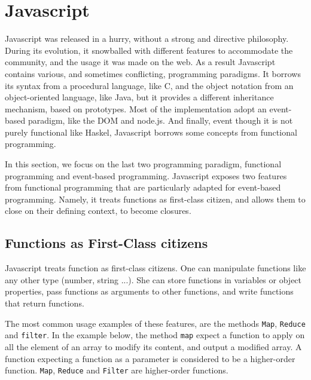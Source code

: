 \section{Javascript}

Javascript was released in a hurry, without a strong and directive philosophy.
During its evolution, it snowballed with different features to accommodate the community, and the usage it was made on the web. As a result Javascript contains various, and sometimes conflicting, programming paradigms.
It borrows its syntax from a procedural language, like C, and the object notation from an object-oriented language, like Java, but it provides a different inheritance mechanism, based on prototypes. Most of the implementation adopt an event-based paradigm, like the DOM and node.js.
And finally, event though it is not purely functional like Haskel, Javascript borrows some concepts from functional programming.

In this section, we focus on the last two programming paradigm, functional programming and event-based programming.
Javascript exposes two features from functional programming that are particularly adapted for event-based programming.
Namely, it treats functions as first-class citizen, and allows them to close on their defining context, to become closures.

\subsection{Functions as First-Class citizens}


Javascript treats function as first-class citizens.
One can manipulate functions like any other type (number, string ...).
She can store functions in variables or object properties, pass functions as arguments to other functions, and write functions that return functions.

The most common usage examples of these features, are the methods \texttt{Map}, \texttt{Reduce} and \texttt{filter}.
In the example below, the method \texttt{map} expect a function to apply on all the element of an array to modify its content, and output a modified array.
A function expecting a function as a parameter is considered to be a higher-order function. \texttt{Map}, \texttt{Reduce} and \texttt{Filter} are higher-order functions.

